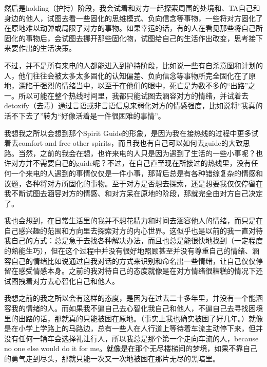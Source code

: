 然后是holding（护持）阶段，我会试着和对方一起探索周围的处境和、TA自己和身边的他人，试图去看一些固化的思维模式、负向信念等事物，一些将对方固化了在原地难以动弹或局限了对方的事物。如果幸运的话，有的人在看见那些将自己所固化的事物后，会试图去挪开那些固化物，试图给自己的生活作出改变，思考接下来要作出的生活决策。

不过，并不是所有来电的人都能进入到护持阶段，比如说一些有自杀意图和计划的人，他们往往会被太多太多固化的认知偏差、负向信念等事物所完全固化在了原地，深陷于强烈的情绪当中，以至于在他们的眼中，死亡是为数不多的“出路”之一。所以可能在整个热线时间里，我都只能试图去涵容对方的情绪，并试着去detoxify（去毒）\pozhehao{}通过言语或非言语信息来弱化对方的情感强度，比如说将“我真的活不下去了”转为“好像活着是一件很困难的事情”。

我想我之所以会想到那个Spirit Guide的形象，是因为我在接热线的过程中更多试着去comfort and free other spirits，而且我也有自己可以如何去guide的大致思路。当然，之前的我会在想，也许来电的人只是因为遇到了生活的一些小事呢？也许对方并不需要自己的guide呢？不过，在自己直至现在所接过的热线里，没有任何一个来电的人遇到的事情仅仅是一件小事，那背后总是有各种错综复杂的情感和议题，各种将对方所固化的事物。至于对方是否想去探索，还是想要我仅仅停留在我不断试图去涵容对方的情感、和对方呆在原地的阶段，那就完全由对方自己决定了。

我也会想到，在日常生活里的我并不想花精力和时间去涵容他人的情绪，而只是在自己感兴趣的范围和方向里去探索对方的内心世界。这似乎也是以前的我一直对待我自己的方式：总是急于去找各种解决办法，而且也总是能很快地找到（一定程度的熟能生巧），但在这个过程中并没有很好地照顾甚至并没有尊重自己的情绪、涵容自己的情绪\pozhehao{}比如说通过自我对话的方式来识别和命名出一些情绪，让自己仅仅停留在感受情感本身。之前的我对待自己的态度就像是在对方情绪很糟糕的情况下还试图拽着对方去心智化自己和他人。

我想之前的我之所以会有这样的态度，是因为在过去二十多年里，并没有一个能涵容我的情绪的人。而如果我不逼自己去心智化我自己和他人，不逼自己去寻找困境里的出路的话，那就真的只能被困在原地。（事实上我也确实被困了好几年。）就像是在小学上学路上的马路边，总有一些人在人行道上等待着车流主动停下来，但并没有任何一辆车会选择礼让行人，所以我总是那个第一个走向车流的人，because no one else would do it for me。就像是在那个无尽楼梯间的梦境，如果不靠自己的勇气走到尽头，那就只能一次又一次地被困在那片无尽的黑暗里。
